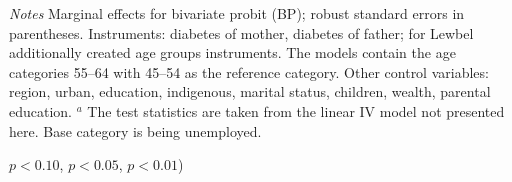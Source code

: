 \begin{table}[ph]
\begin{center}
\begin{adjustbox}{max width=\textwidth, center}
\begin{threeparttable}
{\begin{tabular}{l*{4}{S S}}
\end{tabular} 
\begin{tablenotes}
\item \textit{Notes}  Marginal effects for bivariate probit (BP); robust standard errors in parentheses. Instruments: diabetes of mother, diabetes of father; for Lewbel additionally created age groups instruments. The models contain the age categories 55--64 with 45--54 as the reference category. Other control variables: region, urban, education, indigenous, marital status, children, wealth, parental education. $^a$ The test statistics are taken from the linear IV model not presented here. Base category is being unemployed.
\item \sym{*} \(p<0.10\), \sym{**} \(p<0.05\), \sym{***} \(p<0.01\))
\end{tablenotes}
}
\end{threeparttable} 
\end{adjustbox}
\end{center}
\end{table}



